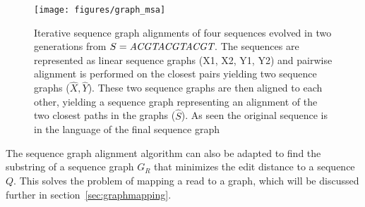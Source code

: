 \begin{figure}
  \texttt{[image: figures/graph\_msa]}

  \caption{
    Iterative sequence graph alignments of four sequences evolved in two generations from $S=\emph{ACGTACGTACGT}$.
    The sequences are represented as linear sequence graphs (X1, X2, Y1, Y2) and pairwise alignment is performed on the closest pairs yielding two sequence graphs ($\hat{X}, \hat{Y}$).
    These two sequence graphs are then aligned to each other, yielding a sequence graph representing an alignment of the two closest paths in the graphs ($\hat{S}$).
    As seen the original sequence is in the language of the final sequence graph}
  \label{fig:treealign}
\end{figure}

The sequence graph alignment algorithm can also be adapted to find the substring of a sequence graph $G_R$ that minimizes the edit distance to a sequence $Q$.
This solves the problem of mapping a read to a graph, which will be discussed further in section~\ref{sec:graphmapping}.


